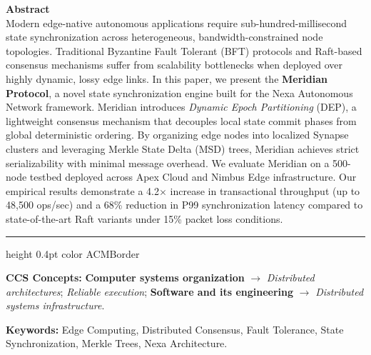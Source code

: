 \documentclass[10pt,a4paper]{article}
\begin{document}
\vspace{10pt}

\begin{tcolorbox}[colback=ACMLight,colframe=ACMBlue,arc=3pt,boxrule=1pt,left=10pt,right=10pt,top=8pt,bottom=8pt]
  \noindent\textbf{\color{ACMBlue}\large Abstract}\\[3pt]
  Modern edge-native autonomous applications require sub-hundred-millisecond state synchronization across heterogeneous, bandwidth-constrained node topologies. Traditional Byzantine Fault Tolerant (BFT) protocols and Raft-based consensus mechanisms suffer from scalability bottlenecks when deployed over highly dynamic, lossy edge links. In this paper, we present the \textbf{Meridian Protocol}, a novel state synchronization engine built for the Nexa Autonomous Network framework. Meridian introduces \emph{Dynamic Epoch Partitioning} (DEP), a lightweight consensus mechanism that decouples local state commit phases from global deterministic ordering. By organizing edge nodes into localized Synapse clusters and leveraging Merkle State Delta (MSD) trees, Meridian achieves strict serializability with minimal message overhead. We evaluate Meridian on a 500-node testbed deployed across Apex Cloud and Nimbus Edge infrastructure. Our empirical results demonstrate a 4.2$\times$ increase in transactional throughput (up to 48,500 ops/sec) and a 68\% reduction in P99 synchronization latency compared to state-of-the-art Raft variants under 15\% packet loss conditions.

  \vspace{5pt}
  \hrule height 0.4pt color ACMBorder
  \vspace{5pt}

  \noindent\textbf{\color{ACMBlue} CCS Concepts:}
  \textbf{Computer systems organization} $\rightarrow$ \emph{Distributed architectures}; \emph{Reliable execution};
  \textbf{Software and its engineering} $\rightarrow$ \emph{Distributed systems infrastructure}.

  \vspace{2pt}
  \noindent\textbf{\color{ACMBlue} Keywords:} Edge Computing, Distributed Consensus, Fault Tolerance, State Synchronization, Merkle Trees, Nexa Architecture.
\end{tcolorbox}

\vspace{4pt}

\end{document}
